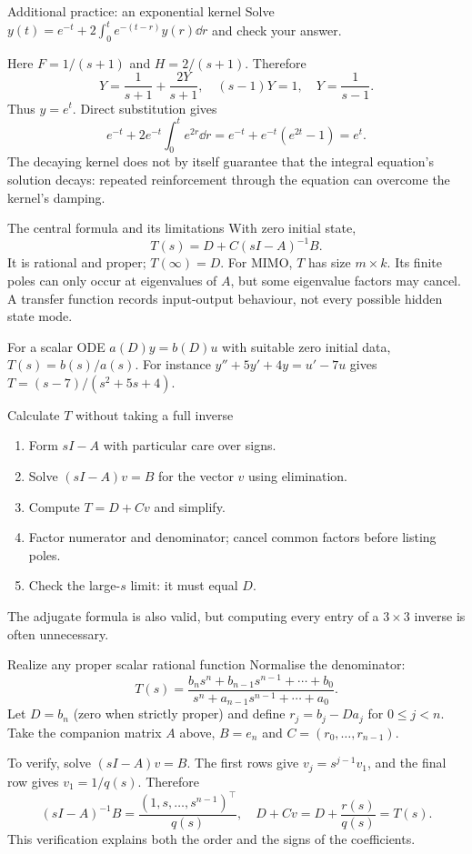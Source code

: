 \begin{question}{Additional practice: an exponential kernel}
Solve $y(t)=e^{-t}+2\int_0^t e^{-(t-r)}y(r)\dd r$ and check your answer.
\end{question}
\begin{answer}
Here $F=1/(s+1)$ and $H=2/(s+1)$. Therefore
\[Y=\frac1{s+1}+\frac{2Y}{s+1},\quad(s-1)Y=1,\quad Y=\frac1{s-1}.\]
Thus $y=e^t$. Direct substitution gives
\[e^{-t}+2e^{-t}\int_0^t e^{2r}\dd r=e^{-t}+e^{-t}(e^{2t}-1)=e^t.\]
The decaying kernel does not by itself guarantee that the integral equation's solution decays: repeated reinforcement through the equation can overcome the kernel's damping.
\end{answer}

\begin{concept}{The central formula and its limitations}
With zero initial state,
\[T(s)=D+C(sI-A)^{-1}B.\]
It is rational and proper; $T(\infty)=D$. For MIMO, $T$ has size $m\times k$. Its finite poles can only occur at eigenvalues of $A$, but some eigenvalue factors may cancel. A transfer function records input-output behaviour, not every possible hidden state mode.

For a scalar ODE $a(D)y=b(D)u$ with suitable zero initial data, $T(s)=b(s)/a(s)$. For instance $y''+5y'+4y=u'-7u$ gives $T=(s-7)/(s^2+5s+4)$.
\end{concept}
\begin{method}{Calculate $T$ without taking a full inverse}
\begin{enumerate}
\item Form $sI-A$ with particular care over signs.
\item Solve $(sI-A)v=B$ for the vector $v$ using elimination.
\item Compute $T=D+Cv$ and simplify.
\item Factor numerator and denominator; cancel common factors before listing poles.
\item Check the large-$s$ limit: it must equal $D$.
\end{enumerate}
The adjugate formula is also valid, but computing every entry of a $3\times3$ inverse is often unnecessary.
\end{method}
\begin{method}{Realize any proper scalar rational function}
Normalise the denominator:
\[T(s)=\frac{b_ns^n+b_{n-1}s^{n-1}+\cdots+b_0}{s^n+a_{n-1}s^{n-1}+\cdots+a_0}.\]
Let $D=b_n$ (zero when strictly proper) and define $r_j=b_j-Da_j$ for $0\leq j<n$. Take the companion matrix $A$ above, $B=e_n$ and $C=(r_0,\ldots,r_{n-1})$.

To verify, solve $(sI-A)v=B$. The first rows give $v_j=s^{j-1}v_1$, and the final row gives $v_1=1/q(s)$. Therefore
\[(sI-A)^{-1}B=\frac{(1,s,\ldots,s^{n-1})^{\top}}{q(s)},\quad D+Cv=D+\frac{r(s)}{q(s)}=T(s).\]
This verification explains both the order and the signs of the coefficients.
\end{method}
